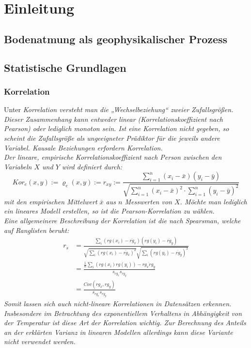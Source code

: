 \section{Einleitung}

\subsection{Bodenatmung als geophysikalischer Prozess}
\cite{foo}

\subsection{Statistische Grundlagen}

\subsubsection{Korrelation}
Unter \it{Korrelation} versteht man die „Wechselbeziehung“ zweier Zufallsgrößen.
Dieser Zusammenhang kann entweder \it{linear} (Korrelationskoeffizient nach Pearson) oder lediglich \it{monoton} sein.
Ist eine Korrelation nicht gegeben, so scheint die Zufallsgröße als ungeeigneter Prädiktor für die jeweils andere Variabel.
Kausale Beziehungen erfordern Korrelation.
\\
Der \it{lineare, empirische Korrelationskoeffizient nach Person} zwischen den Variabeln $X$ und $Y$ wird definiert durch:
\begin{equation}
	Kor_e(x,y) := \varrho_e(x,y) := r_{xy} := \frac{
		\sum_{i=1}^n(x_i-\bar x)(y_i-\bar y)
	}{
	\sqrt{
		\sum_{i=1}^n(x_i-\bar x)^2\cdot
		\sum_{i=1}^n(y_i-\bar y)^2
	}
	}
\end{equation}
mit den empirischen Mittelwert $\bar x$ aus $n$ Messwerten von $X$.
Möchte man lediglich ein \it{lineares} Modell erstellen, so ist die Pearson-Korrelation zu wählen.
\\
Eine allgemeinere Beschreibung der Korrelation ist die nach \it{Spearsman}, welche auf Ranglisten beruht:\\
\begin{align}
	r_s &= \frac{\sum_{i}(rg(x_i)-\overline{rg}_x)(rg(y_i)-\overline{rg}_y)} {\sqrt{\sum_{i}(rg(x_i)-\overline{rg}_x) ^2}\sqrt{\sum_{i}(rg(y_i)-\overline{rg}_y)^2}}\\
	&= \frac { \frac{1}{n} \sum_{i}(rg(x_{i})  rg(y_{i})) - \overline{rg_x rg_y}  }{s_{rg_x} s_{rg_y}} \\
	&= \frac {{Cov}(rg_{x},rg_{y} )} { s_{rg_x} s_{rg_y} }
\end{align}
Somit lassen sich auch nicht-lineare Korrelationen in Datensätzen erkennen.
Insbesondere im Betrachtung des exponentiellem Verhaltens in Abhängigkeit von der Temperatur ist diese Art der Korrelation wichtig.
Zur Berechnung des Anteils an der \it{erklärten} Varianz in linearen Modellen allerdings kann diese Variante nicht verwendet werden.

